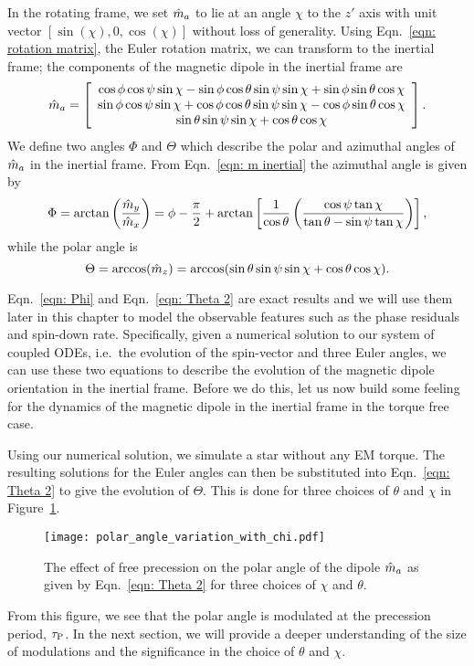 \documentclass[../full_thesis/full_thesis.tex]{subfiles}
\begin{document}
In the rotating frame, we set $\hat{m}_a$ to lie at an angle $\chi$ to the $z'$ axis
with unit vector $[\sin(\chi), 0, \cos(\chi)]$ without loss of generality.
Using Eqn.~\eqref{eqn: rotation matrix}, the Euler
rotation matrix, we can transform to the inertial frame; the components of the
magnetic dipole in the inertial frame are
\begin{equation}
\hat{m}_a =
\left[\begin{array}{c}
\cos\phi\cos\psi\sin\chi - \sin\phi \cos \theta \sin \psi \sin \chi
+ \sin \phi \sin \theta \cos \chi \\
\sin\phi\cos\psi\sin\chi + \cos\phi \cos \theta \sin \psi \sin \chi
- \cos \phi \sin \theta \cos \chi \\
\sin\theta \sin\psi \sin\chi + \cos\theta \cos \chi
\end{array}\right].
\label{eqn: m inertial}
\end{equation}
We define two angles $\Phi$ and $\Theta$
which describe the polar and azimuthal angles of $\hat{m}_a$ in the inertial frame.
From Eqn.~\eqref{eqn: m inertial} the azimuthal angle is given by
\begin{equation}
    \Phi = \arctan\left(\frac{\hat{m}_{y}}{\hat{m}_{x}}\right) =
    \phi - \frac{\pi}{2} + \arctan\left[\frac{1}{\cos\theta}
    \left(\frac{\cos\psi \tan \chi}{\tan\theta -
            \sin \psi \tan\chi }\right)\right],
\label{eqn: Phi}
\end{equation}
while the polar angle is
\begin{equation}
\Theta = \arccos(\hat{m}_{z}) = \arccos(\sin \theta \sin \psi \sin \chi + \cos \theta \cos \chi ).
\label{eqn: Theta 2}
\end{equation}

Eqn.~\eqref{eqn: Phi} and Eqn.~\eqref{eqn: Theta 2} are exact results and
we will use them later in this chapter to model the observable features such
as the phase residuals and spin-down rate.
Specifically, given a numerical solution to our system of coupled ODEs, i.e.\ the evolution of the spin-vector and three Euler angles, we can use these two
equations to describe the evolution of the magnetic dipole orientation in the
inertial frame. Before we do this, let us now build some feeling for the dynamics of
the magnetic dipole in the inertial frame in the torque free case.

Using our numerical solution, we simulate a star without any EM torque. The
resulting solutions for the Euler angles can then be substituted into Eqn.~\eqref{eqn: Theta 2}
to give the evolution of $\Theta$. This is done for three choices of $\theta$
and $\chi$ in Figure~\ref{fig: polar angle variations}.
\begin{figure}[htb]
\centering
  \texttt{[image: polar\_angle\_variation\_with\_chi.pdf]}
\caption{The effect of free precession on the polar angle of the dipole $\hat{m}_a$
as given by Eqn.~\eqref{eqn: Theta 2} for three choices of $\chi$ and
$\theta$.}
\label{fig: polar angle variations}
\end{figure}
From this figure, we see that the polar angle is modulated at the precession
period, $\tau_{\mathrm{P}}$. In the next section, we will provide a deeper understanding
of the size of modulations and the significance in the choice
of $\theta$ and $\chi$.
\end{document}
